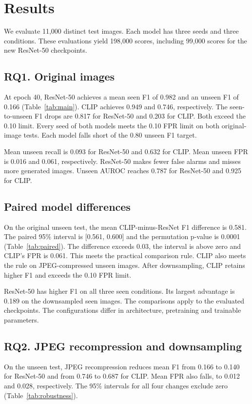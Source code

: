 \documentclass[11pt,a4paper]{article}
\newcommand{\resultstable}[1]{}
\begin{document}
\section{Results}
We evaluate 11,000 distinct test images. Each model has three seeds and three conditions. These evaluations yield 198,000 scores, including 99,000 scores for the new ResNet-50 checkpoints.

\subsection{RQ1. Original images}
At epoch 40, ResNet-50 achieves a mean seen F1 of 0.982 and an unseen F1 of 0.166 (Table~\ref{tab:main}). CLIP achieves 0.949 and 0.746, respectively. The seen-to-unseen F1 drops are 0.817 for ResNet-50 and 0.203 for CLIP. Both exceed the 0.10 limit. Every seed of both models meets the 0.10 FPR limit on both original-image tests. Each model falls short of the 0.80 unseen F1 target.

Mean unseen recall is 0.093 for ResNet-50 and 0.632 for CLIP. Mean unseen FPR is 0.016 and 0.061, respectively. ResNet-50 makes fewer false alarms and misses more generated images. Unseen AUROC reaches 0.787 for ResNet-50 and 0.925 for CLIP.

\resultstable{main_results}

\subsection{Paired model differences}
On the original unseen test, the mean CLIP-minus-ResNet F1 difference is 0.581. The paired 95\% interval is [0.561, 0.600] and the permutation p-value is 0.0001 (Table~\ref{tab:paired}). The difference exceeds 0.03, the interval is above zero and CLIP's FPR is 0.061. This meets the practical comparison rule. CLIP also meets the rule on JPEG-compressed unseen images. After downsampling, CLIP retains higher F1 and exceeds the 0.10 FPR limit.

ResNet-50 has higher F1 on all three seen conditions. Its largest advantage is 0.189 on the downsampled seen images. The comparisons apply to the evaluated checkpoints. The configurations differ in architecture, pretraining and trainable parameters.

\resultstable{paired}

\subsection{RQ2. JPEG recompression and downsampling}
On the unseen test, JPEG recompression reduces mean F1 from 0.166 to 0.140 for ResNet-50 and from 0.746 to 0.687 for CLIP. Mean FPR also falls, to 0.012 and 0.028, respectively. The 95\% intervals for all four changes exclude zero (Table~\ref{tab:robustness}).
\end{document}
